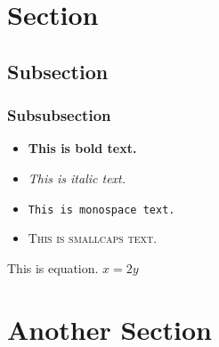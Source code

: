 \documentclass[palatino,english]{ist-report}
\begin{document}
\section{Section}

\lipsum[1]

\subsection{Subsection}

\lipsum[1-2]

\subsubsection{Subsubsection}

\begin{itemize}
	\item \textbf{This is bold text.}
	\item \textit{This is italic text.}
	\item \texttt{This is monospace text.}
	\item \textsc{This is smallcaps text.}
\end{itemize}

This is equation. $x = 2y$

\section{Another Section}

\lipsum[1-13]
\end{document}

